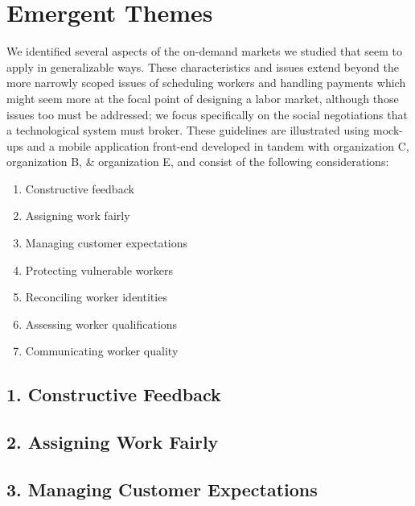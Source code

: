 \section{Emergent Themes}
We identified several aspects of the on-demand markets we studied that seem to apply in generalizable ways.
These characteristics and issues extend beyond the more narrowly scoped issues of scheduling workers and handling payments which might seem more at the focal point of designing a labor market, although those issues too must be addressed;
we focus specifically on the social negotiations that a technological system must broker.
These guidelines are illustrated using mock-ups and a mobile application front-end developed in tandem with organization C, organization B, \& organization E, and consist of the following considerations:

\begin{enumerate} \itemsep0pt \parskip0pt
  \item Constructive feedback
  \item Assigning work fairly
  \item Managing customer expectations
  \item Protecting vulnerable workers
  \item Reconciling worker identities
  \item Assessing worker qualifications
  \item Communicating worker quality
\end{enumerate}


\subsection{1.        Constructive Feedback}

\subsection{2.        Assigning Work Fairly}

\subsection{3.        Managing Customer Expectations}

